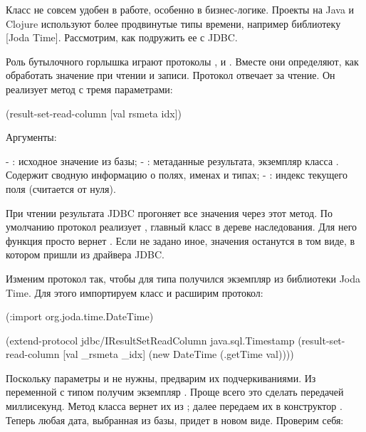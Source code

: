 \def\urljodatime{https://www.joda.org/joda-time/}

Класс  не совсем удобен в работе, особенно в бизнес-логике. Проекты на Java и Clojure используют более продвинутые типы времени, например библиотеку \footurl{Joda Time}{\urljodatime}[Joda Time]. Рассмотрим, как подружить ее с JDBC.

Роль бутылочного горлышка играют протоколы ,  и . Вместе они определяют, как обработать значение при чтении и записи. Протокол  отвечает за чтение. Он реализует метод с тремя параметрами:

\begin{english}
  \begin{clojure}
(result-set-read-column [val rsmeta idx])
  \end{clojure}
\end{english}

Аргументы:

- : исходное значение из базы;
- : метаданные результата, экземпляр класса . Содержит сводную информацию о полях, именах и типах;
- : индекс текущего поля (считается от нуля).

При чтении результата JDBC прогоняет все значения через этот метод. По умолчанию протокол реализует , главный класс в дереве наследования. Для него функция  просто вернет . Если не задано иное, значения останутся в том виде, в котором пришли из драйвера JDBC.

Изменим протокол так, чтобы для типа  получился экземпляр  из библиотеки Joda Time. Для этого импортируем класс и расширим протокол:

\begin{english}
  \begin{clojure}
(:import org.joda.time.DateTime)

(extend-protocol jdbc/IResultSetReadColumn
  java.sql.Timestamp
  (result-set-read-column [val _rsmeta _idx]
    (new DateTime (.getTime val))))
  \end{clojure}
\end{english}

Поскольку параметры  и  не нужны, предварим их подчеркиваниями. Из переменной  с типом  получим экземпляр . Проще всего это сделать передачей миллисекунд. Метод  класса  вернет их из ; далее передаем их в конструктор . Теперь любая дата, выбранная из базы, придет в новом виде. Проверим себя:

